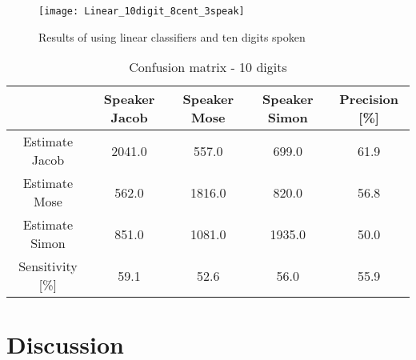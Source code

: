 \begin{figure}[H]
\centering
\texttt{[image: Linear\_10digit\_8cent\_3speak]}
\caption{Results of using linear classifiers and ten digits spoken}
\label{fig:Lin_fig_2}
\end{figure}
\begin{table}[H]                                                    
\centering                                                          
\begin{tabular}{|c|c|c|c|c|}                                        
\hline                                                              
  & Speaker Jacob & Speaker Mose & Speaker Simon & Precision [\%] \\
\hline                                                              
Estimate Jacob & 2041.0 & 557.0 & 699.0 & 61.9 \\                   
\hline                                                              
Estimate Mose & 562.0 & 1816.0 & 820.0 & 56.8 \\                    
\hline                                                              
Estimate Simon & 851.0 & 1081.0 & 1935.0 & 50.0 \\                  
\hline                                                              
Sensitivity [\%] & 59.1 & 52.6 & 56.0 & 55.9 \\                     
\hline                                                              
\end{tabular}                                                       
\caption{Confusion matrix - 10 digits}                              
\label{table:Lin_conf_10}                                           
\end{table}                                                         


\section{Discussion}









